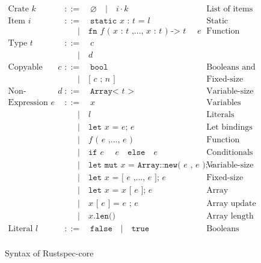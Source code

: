 \documentclass[10pt, english, a4paper]{article}
\newcommand{\rust}[1]{\texttt{#1}}
\begin{document}
\begin{figure}
\begin{align*}
\text{Crate } \rust{$k$}  &::=\quad \varnothing \quad|\quad i\cdot k &\text{List of items}\\
\text{Item } \rust{$i$}     &::=\quad \rust{static $x$ : $t$ = $l$}&\text{Static variables} \\
                            &\quad\;\;|\quad \rust{fn $f$ ( $x$ : $t$ ,..., $x$ : $t$ ) -> $t$ { $e$ }}&\text{Function}\\
\text{Type }\rust{$t$}      &::=\quad \rust{$c$}\\
                            &\quad\;\;|\quad \rust{$d$}\\
\text{Copyable type }\rust{$c$} &::=\quad \rust{bool}&\text{Booleans and integers}\\
                            &\quad\;\;|\quad \rust{[ $c$ ; $n$ ]}&\text{Fixed-size arrays}\\
\text{Non-copyable type }\rust{$d$} &::=\quad \rust{Array< $t$ >}&\text{Variable-size arrays} \\
\text{Expression }\rust{$e$}&::=\quad \rust{$x$}&\text{Variables} \\
                            &\quad\;\;|\quad\rust{$l$}&\text{Literals}\\
                            &\quad\;\;|\quad  \rust{let $x$ = $e$; $e$}&\text{Let bindings} \\
                            &\quad\;\;|\quad \rust{$f$ ( $e$ ,..., $e$ )}&\text{Function calls} \\
                            &\quad\;\;|\quad \rust{if $e$ { $e$ } else { $e$ } }&\text{Conditionals}\\
                            &\quad\;\;|\quad \rust{let mut $x$ = Array::new( $e$ , $e$ ); $e$}&\text{Variable-size arrays}\\
                            &\quad\;\;|\quad \rust{let $x$ = [ $e$ ,..., $e$ ]; $e$}&\text{Fixed-size arrays}\\
                            &\quad\;\;|\quad \rust{let $x$ = $x$ [ $e$ ]; $e$}&\text{Array indexing}\\
                            &\quad\;\;|\quad \rust{$x$ [ $e$ ] = $e$ ; $e$}&\text{Array update}\\
                            &\quad\;\;|\quad \rust{$x$.len()}&\text{Array length}\\
\text{Literal }\rust{$l$}&::=\quad \rust{false}\quad|\quad\rust{true}&\text{Booleans}\\
\end{align*}
\caption{Syntax of Rustspec-core\label{fig:rustspec-core-syntax}}
\end{figure}
\end{document}
